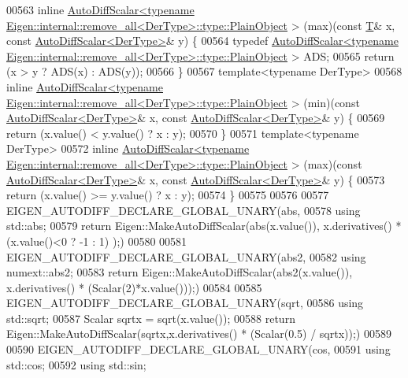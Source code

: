 \begin{DoxyCode}
00563 \textcolor{keyword}{inline} 
      \hyperlink{class_eigen_1_1_auto_diff_scalar}{AutoDiffScalar<typename Eigen::internal::remove\_all<DerType>::type::PlainObject}
      > (max)(\textcolor{keyword}{const} \hyperlink{group___sparse_core___module}{T}& x, \textcolor{keyword}{const} \hyperlink{class_eigen_1_1_auto_diff_scalar}{AutoDiffScalar<DerType>}& y) \{
00564   \textcolor{keyword}{typedef} 
      \hyperlink{class_eigen_1_1_auto_diff_scalar}{AutoDiffScalar<typename Eigen::internal::remove\_all<DerType>::type::PlainObject}
      > ADS;
00565   \textcolor{keywordflow}{return} (x > y ? ADS(x) : ADS(y));
00566 \}
00567 \textcolor{keyword}{template}<\textcolor{keyword}{typename} DerType>
00568 \textcolor{keyword}{inline} 
      \hyperlink{class_eigen_1_1_auto_diff_scalar}{AutoDiffScalar<typename Eigen::internal::remove\_all<DerType>::type::PlainObject}
      > (min)(\textcolor{keyword}{const} \hyperlink{class_eigen_1_1_auto_diff_scalar}{AutoDiffScalar<DerType>}& x, \textcolor{keyword}{const} 
      \hyperlink{class_eigen_1_1_auto_diff_scalar}{AutoDiffScalar<DerType>}& y) \{
00569   \textcolor{keywordflow}{return} (x.value() < y.value() ? x : y);
00570 \}
00571 \textcolor{keyword}{template}<\textcolor{keyword}{typename} DerType>
00572 \textcolor{keyword}{inline} 
      \hyperlink{class_eigen_1_1_auto_diff_scalar}{AutoDiffScalar<typename Eigen::internal::remove\_all<DerType>::type::PlainObject}
      > (max)(\textcolor{keyword}{const} \hyperlink{class_eigen_1_1_auto_diff_scalar}{AutoDiffScalar<DerType>}& x, \textcolor{keyword}{const} 
      \hyperlink{class_eigen_1_1_auto_diff_scalar}{AutoDiffScalar<DerType>}& y) \{
00573   \textcolor{keywordflow}{return} (x.value() >= y.value() ? x : y);
00574 \}
00575 
00576 
00577 EIGEN\_AUTODIFF\_DECLARE\_GLOBAL\_UNARY(abs,
00578   \textcolor{keyword}{using} std::abs;
00579   \textcolor{keywordflow}{return} Eigen::MakeAutoDiffScalar(abs(x.value()), x.derivatives() * (x.value()<0 ? -1 : 1) );)
00580 
00581 EIGEN\_AUTODIFF\_DECLARE\_GLOBAL\_UNARY(abs2,
00582   \textcolor{keyword}{using} numext::abs2;
00583   \textcolor{keywordflow}{return} Eigen::MakeAutoDiffScalar(abs2(x.value()), x.derivatives() * (Scalar(2)*x.value()));)
00584 
00585 EIGEN\_AUTODIFF\_DECLARE\_GLOBAL\_UNARY(sqrt,
00586   \textcolor{keyword}{using} std::sqrt;
00587   Scalar sqrtx = sqrt(x.value());
00588   \textcolor{keywordflow}{return} Eigen::MakeAutoDiffScalar(sqrtx,x.derivatives() * (Scalar(0.5) / sqrtx));)
00589 
00590 EIGEN\_AUTODIFF\_DECLARE\_GLOBAL\_UNARY(cos,
00591   \textcolor{keyword}{using} std::cos;
00592   \textcolor{keyword}{using} std::sin;

\end{DoxyCode}
